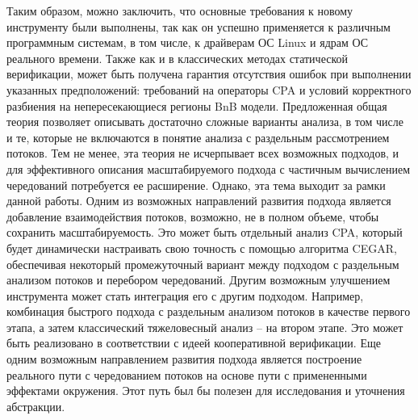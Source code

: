 Таким образом, можно заключить, что основные требования к новому инструменту были выполнены, так как он успешно применяется к различным программным системам, в том числе, к драйверам ОС Linux и ядрам ОС реального времени.
Также как и в классических методах статической верификации, может быть получена гарантия отсутствия ошибок при выполнении указанных предположений: требований на операторы CPA и условий корректного разбиения на непересекающиеся регионы BnB модели.
Предложенная общая теория позволяет описывать достаточно сложные варианты анализа, в том числе и те, которые не включаются в понятие анализа с раздельным рассмотрением потоков.
Тем не менее, эта теория не исчерпывает всех возможных подходов, и для эффективного описания масштабируемого подхода с частичным вычислением чередований потребуется ее расширение. Однако, эта тема выходит за рамки данной работы.
Одним из возможных направлений развития подхода является добавление взаимодействия потоков, возможно, не в полном объеме, чтобы сохранить масштабируемость.
Это может быть отдельный анализ CPA, который будет динамически настраивать свою точность с помощью алгоритма CEGAR, обеспечивая некоторый промежуточный вариант между подходом с раздельным анализом потоков и перебором чередований.
Другим возможным улучшением инструмента может стать интеграция его с другим подходом. 
Например, комбинация быстрого подхода с раздельным анализом потоков в качестве первого этапа, а затем классический тяжеловесный анализ – на втором этапе. Это может быть реализовано в соответствии с идеей кооперативной верификации.
Еще одним возможным направлением развития подхода является построение реального пути с чередованием потоков на основе пути с примененными эффектами окружения. Этот путь был бы полезен для исследования и уточнения абстракции. 
